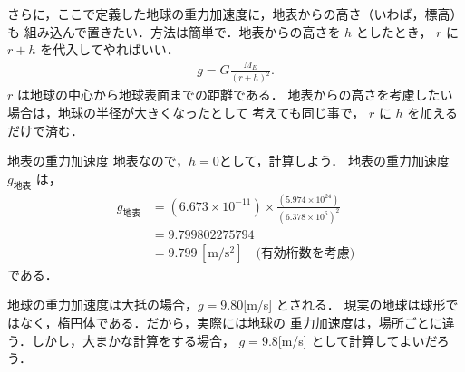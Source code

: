             さらに，ここで定義した地球の重力加速度に，地表からの高さ（いわば，標高）も
            組み込んで置きたい．方法は簡単で．地表からの高さを $h$ としたとき，
            $r$ に $r+h$ を代入してやればいい．
                \begin{align}
                    g = G\frac{M_{E}}{{(r+h)}^{2}}.
                \end{align}
            $r$ は地球の中心から地球表面までの距離である．
            地表からの高さを考慮したい場合は，地球の半径が大きくなったとして
            考えても同じ事で， $r$ に $h$ を加えるだけで済む．

            \begin{memo}{地表の重力加速度}
                地表なので，$h=0$として，計算しよう．
                地表の重力加速度 ${g}_{\mbox{地表}}$ は，
                \begin{align*}
                    {g}_{\mbox{地表}}
                    &= (6.673 \times 10^{-11}) \times
                        \frac{(5.974 \times 10^{24})}
                             {{(6.378 \times 10^{6})}^{2}} \\
                    &= 9.799802275794 \\
                    &= 9.799  \,\mathrm{[m/s^{2}]} \quad \mbox{(有効桁数を考慮)}
                \end{align*}
                である．

                地球の重力加速度は大抵の場合，$g=9.80$[m/s] とされる．
                現実の地球は球形ではなく，楕円体である．だから，実際には地球の
                重力加速度は，場所ごとに違う．しかし，大まかな計算をする場合，
                $g=9.8$[m/s] として計算してよいだろう．

            \end{memo}

